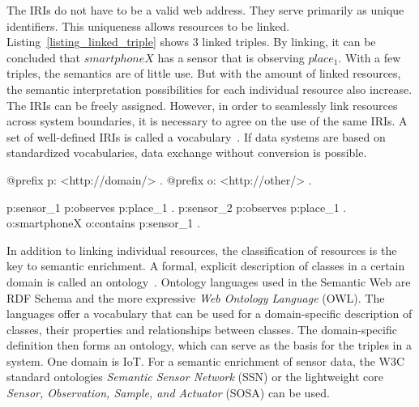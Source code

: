 \documentclass[english,version-2019-11]{uzl-thesis}
\begin{document}
The IRIs do not have to be a valid web address. They serve primarily as unique identifiers. This uniqueness allows resources to be linked. Listing~\ref{listing_linked_triple} shows $3$ linked triples. By linking, it can be concluded that $smartphoneX$ has a sensor that is observing $place_1$. With a few triples, the semantics are of little use. But with the amount of linked resources, the semantic interpretation possibilities for each individual resource also increase. The IRIs can be freely assigned. However, in order to seamlessly link resources across system boundaries, it is necessary to agree on the use of the same IRIs. A set of well-defined IRIs is called a vocabulary~\cite{SWBookHitzler}. If data systems are based on standardized vocabularies, data exchange without conversion is possible.
\begin{SPARQL}[caption={A simple example of linking triples using IRIs.},
  float, label=listing_linked_triple, morekeywords={@prefix}, captionpos=b]
@prefix p: <http://domain/> .
@prefix o: <http://other/> .

p:sensor_1 p:observes p:place_1 .
p:sensor_2 p:observes p:place_1 .
o:smartphoneX o:contains p:sensor_1 .
\end{SPARQL}

In addition to linking individual resources, the classification of resources is the key to semantic enrichment. A formal, explicit description of classes in a certain domain is called an ontology~\cite{SWBook}. Ontology languages used in the Semantic Web are RDF Schema and the more expressive \emph{Web Ontology Language} (OWL).
The languages offer a vocabulary that can be used for a domain-specific description of classes, their properties and relationships between classes. The domain-specific definition then forms an ontology, which can serve as the basis for the triples in a system. One domain is IoT. For a semantic enrichment of sensor data, the W3C standard ontologies \emph{Semantic Sensor Network} (SSN) or the lightweight core \emph{Sensor, Observation, Sample, and Actuator} (SOSA) can be used.
\end{document}
